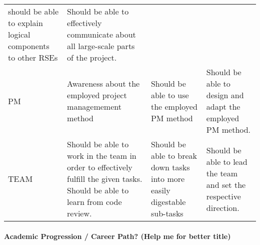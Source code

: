 \documentclass[a4paper
]{article}
\begin{document}
\begin{landscape}
\begin{longtable}[]{@{}llll@{}}
\begin{minipage}[t]{0.28\columnwidth}
should be able to explain logical components to other RSEs\strut
\end{minipage} & \begin{minipage}[t]{0.14\columnwidth}\raggedright
Should be able to effectively communicate about all large-scale parts of
the project.\strut
\end{minipage}\tabularnewline
\begin{minipage}[t]{0.19\columnwidth}\raggedright
PM\strut
\end{minipage} & \begin{minipage}[t]{0.28\columnwidth}\raggedright
Awareness about the employed project managemement method\strut
\end{minipage} & \begin{minipage}[t]{0.28\columnwidth}\raggedright
Should be able to use the employed PM method\strut
\end{minipage} & \begin{minipage}[t]{0.14\columnwidth}\raggedright
Should be able to design and adapt the employed PM method.\strut
\end{minipage}\tabularnewline
\begin{minipage}[t]{0.19\columnwidth}\raggedright
TEAM\strut
\end{minipage} & \begin{minipage}[t]{0.28\columnwidth}\raggedright
Should be able to work in the team in order to effectively fulfill the
given tasks. Should be able to learn from code review.\strut
\end{minipage} & \begin{minipage}[t]{0.28\columnwidth}\raggedright
Should be able to break down tasks into more easily digestable
sub-tasks\strut
\end{minipage} & \begin{minipage}[t]{0.14\columnwidth}\raggedright
Should be able to lead the team and set the respective direction.\strut
\end{minipage}\tabularnewline
\bottomrule
\end{longtable}

\end{landscape}

\hypertarget{academic-progression-career-path-help-me-for-better-title}{%
\paragraph{Academic Progression / Career Path? (Help me for better
title)}\label{academic-progression-career-path-help-me-for-better-title}}
\end{document}
